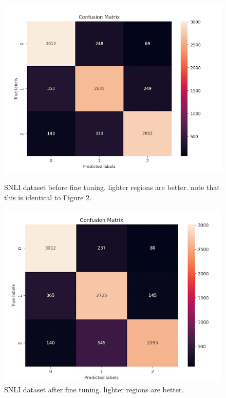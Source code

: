 \documentclass{article}
\begin{document}
\begin{figure}[!h]
	\centering
	\begin{minipage}{0.44\textwidth}
		\includegraphics[width=\linewidth]{images/confusion_trained_snli.png}
		\caption{SNLI dataset before fine tuning. lighter regions are better. note that this is identical to Figure 2.}
	\end{minipage}
	\hfill
	\begin{minipage}{0.44\textwidth}
		\includegraphics[width=\linewidth]{images/confusion_tuned_snli.png}
		\caption{SNLI dataset after fine tuning. lighter regions are better.}
	\end{minipage}
\end{figure}
\end{document}
